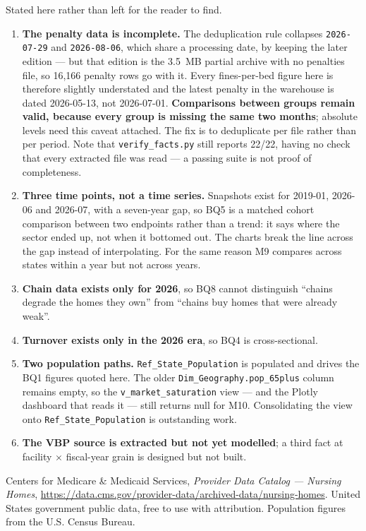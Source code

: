 \documentclass[11pt,a4paper]{article}
\newcommand{\code}[1]{\texttt{#1}}
\begin{document}
Stated here rather than left for the reader to find.

\begin{enumerate}
\item \textbf{The penalty data is incomplete.} The deduplication rule collapses
  \code{2026-07-29} and \code{2026-08-06}, which share a processing date, by
  keeping the later edition — but that edition is the 3.5~MB partial archive
  with no penalties file, so 16{,}166 penalty rows go with it. Every
  fines-per-bed figure here is therefore slightly understated and the latest
  penalty in the warehouse is dated 2026-05-13, not 2026-07-01.
  \textbf{Comparisons between groups remain valid, because every group is
  missing the same two months}; absolute levels need this caveat attached. The
  fix is to deduplicate per file rather than per period. Note that
  \code{verify\_facts.py} still reports 22/22, having no check that every
  extracted file was read — a passing suite is not proof of completeness.
\item \textbf{Three time points, not a time series.} Snapshots exist for
  2019-01, 2026-06 and 2026-07, with a seven-year gap, so BQ5 is a matched
  cohort comparison between two endpoints rather than a trend: it says where the
  sector ended up, not when it bottomed out. The charts break the line across
  the gap instead of interpolating. For the same reason M9 compares across
  states within a year but not across years.
\item \textbf{Chain data exists only for 2026}, so BQ8 cannot distinguish
  ``chains degrade the homes they own'' from ``chains buy homes that were already
  weak''.
\item \textbf{Turnover exists only in the 2026 era}, so BQ4 is cross-sectional.
\item \textbf{Two population paths.} \code{Ref\_State\_Population} is populated
  and drives the BQ1 figures quoted here. The older
  \code{Dim\_Geography.pop\_65plus} column remains empty, so the
  \code{v\_market\_saturation} view — and the Plotly dashboard that reads it —
  still returns null for M10. Consolidating the view onto
  \code{Ref\_State\_Population} is outstanding work.
\item \textbf{The VBP source is extracted but not yet modelled}; a third fact at
  facility $\times$ fiscal-year grain is designed but not built.
\end{enumerate}

\vspace{0.6em}
\begin{keybox}[title={Data source and licence}]
Centers for Medicare \& Medicaid Services, \textit{Provider Data Catalog —
Nursing Homes}, \url{https://data.cms.gov/provider-data/archived-data/nursing-homes}.
United States government public data, free to use with attribution.
Population figures from the U.S. Census Bureau.
\end{keybox}
\end{document}
